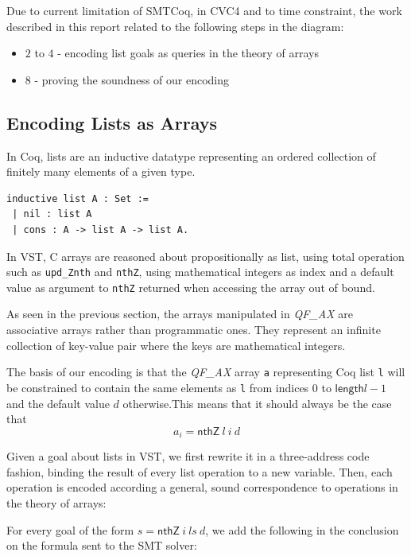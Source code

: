 \documentclass[onecolumn, preprint]{sigplanconf}
\begin{document}
Due to current limitation of SMTCoq, in CVC4 and to time constraint, the work described in this report related to the following steps in the diagram:
\begin{itemize}
  \item $2$ to $4$ - encoding list goals as queries in the theory of arrays
  \item $8$ - proving the soundness of our encoding
\end{itemize}







\subsection{Encoding Lists as Arrays}

In Coq, lists are an inductive datatype representing an ordered collection of finitely many elements of a given type. 
\begin{lstlisting}
inductive list A : Set :=
 | nil : list A
 | cons : A -> list A -> list A.
\end{lstlisting}

In VST, C arrays are reasoned about propositionally as list, using total operation such as \lstinline|upd_Znth| and \lstinline|nthZ|, using mathematical integers as index and a default value as argument to \lstinline|nthZ| returned when accessing the array out of bound. 

As seen in the previous section, the arrays manipulated in \emph{QF\_AX} are associative arrays rather than programmatic ones. They represent an infinite collection of key-value pair where the keys are mathematical integers. 

The basis of our encoding is that the \emph{QF\_AX} array \lstinline|a| representing Coq list \lstinline|l| will be constrained to contain the same elements as \lstinline|l| from indices $0$ to $\mathsf{length} l - 1$ and the default value $d$ otherwise.This means that it should always be the case that
$$ a_i = \textsf{nthZ}\ l\ i\ d$$

Given a goal about lists in VST, we first rewrite it in a three-address code fashion, binding the result of every list operation to a new variable. Then, each operation is encoded according a general, sound correspondence to operations in the theory of arrays:

For every goal of the form $s = \textsf{nthZ}\ i\ ls\ d$, we add the following in the conclusion on the formula sent to the SMT solver:
\end{document}
